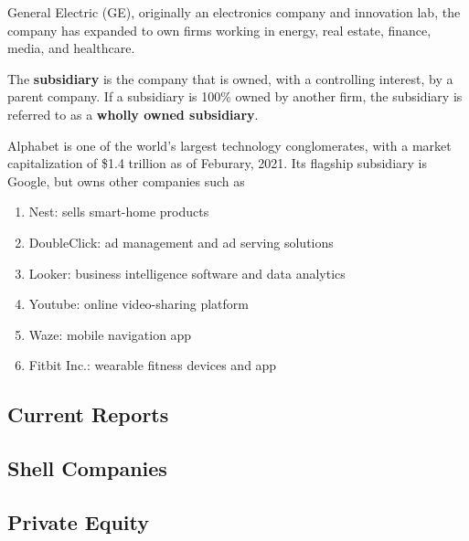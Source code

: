 \documentclass{article}
\begin{document}
      \begin{example}
        General Electric (GE), originally an electronics company and innovation lab, the company has expanded to own firms working in energy, real estate, finance, media, and healthcare. 
      \end{example}

      \begin{definition}[Subsidiary]
        The \textbf{subsidiary} is the company that is owned, with a controlling interest, by a parent company. If a subsidiary is 100\% owned by another firm, the subsidiary is referred to as a \textbf{wholly owned subsidiary}. 
      \end{definition}

      \begin{definition}[Alphabet]
        Alphabet is one of the world's largest technology conglomerates, with a market capitalization of \$1.4 trillion as of Feburary, 2021. Its flagship subsidiary is Google, but owns other companies such as
        \begin{enumerate}
          \item Nest: sells smart-home products
          \item DoubleClick: ad management and ad serving solutions
          \item Looker: business intelligence software and data analytics
          \item Youtube: online video-sharing platform
          \item Waze: mobile navigation app
          \item Fitbit Inc.: wearable fitness devices and app
        \end{enumerate}
      \end{definition}

  \subsection{Current Reports}

  \subsection{Shell Companies}

  \subsection{Private Equity}
\end{document}
